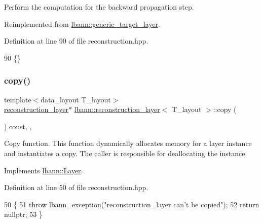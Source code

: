 Perform the computation for the backward propagation step. 

Reimplemented from \hyperlink{classlbann_1_1generic__target__layer_ab29b31c81b115acd7e01de25ef190b99}{lbann\+::generic\+\_\+target\+\_\+layer}.



Definition at line 90 of file reconstruction.\+hpp.


\begin{DoxyCode}
90 \{\}
\end{DoxyCode}
\mbox{\label{classlbann_1_1reconstruction__layer_a7f6587284527a50475bf1cc0868fa595}} 
\subsubsection{\texorpdfstring{copy()}{copy()}}
{\footnotesize\ttfamily template$<$data\+\_\+layout T\+\_\+layout$>$ \\
\hyperlink{classlbann_1_1reconstruction__layer}{reconstruction\+\_\+layer}$\ast$ \hyperlink{classlbann_1_1reconstruction__layer}{lbann\+::reconstruction\+\_\+layer}$<$ T\+\_\+layout $>$\+::copy (\begin{DoxyParamCaption}{ }\end{DoxyParamCaption}) const\hspace{0.3cm}{\ttfamily [inline]}, {\ttfamily [override]}, {\ttfamily [virtual]}}

Copy function. This function dynamically allocates memory for a layer instance and instantiates a copy. The caller is responsible for deallocating the instance. 

Implements \hyperlink{classlbann_1_1Layer_af420f22bbac801c85483ade84588a23f}{lbann\+::\+Layer}.



Definition at line 50 of file reconstruction.\+hpp.


\begin{DoxyCode}
50                                               \{
51     \textcolor{keywordflow}{throw} lbann\_exception(\textcolor{stringliteral}{"reconstruction\_layer can't be copied"});
52     \textcolor{keywordflow}{return} \textcolor{keyword}{nullptr};
53   \}
\end{DoxyCode}
\mbox{\label{classlbann_1_1reconstruction__layer_ad33ec2cccf89b317e22ec73b1761e427}} 
